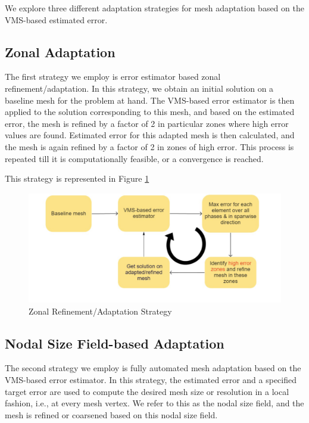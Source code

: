 We explore three different adaptation strategies for mesh adaptation based on the VMS-based estimated error. 

\subsection{Zonal Adaptation}




The first strategy we employ is error estimator based zonal refinement/adaptation. 
In this strategy, we obtain an initial solution on a baseline mesh for the problem at hand. The VMS-based error estimator is then applied to the solution corresponding to this mesh, and based on the estimated error, the mesh is refined by a factor of 2 in particular zones where high error values are found. Estimated error for this adapted mesh is then calculated, and the mesh is again refined by a factor of 2 in zones of high error. This process is repeated till it is computationally feasible, or a convergence is reached.

This strategy is represented in Figure \ref{fig:zonal_based_strat}

\begin{figure}[H]
	\centering
	\includegraphics[width=1\textwidth]{figures/adapt_strat/zonal_based.png}
	\caption{Zonal Refinement/Adaptation Strategy}
	\label{fig:zonal_based_strat}
\end{figure}

\subsection{Nodal Size Field-based Adaptation}

The second strategy we employ is fully automated mesh adaptation based on the VMS-based error estimator. In this strategy, the estimated error and a specified target error are used to compute the desired mesh size or resolution in a local fashion, i.e., at every mesh vertex. We refer to this as the nodal size field, and the mesh is refined or coarsened based on this nodal size field. 

